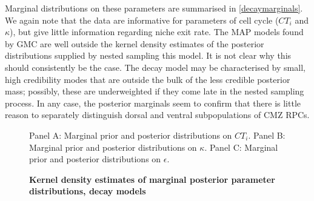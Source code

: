 \documentclass{ut-thesis}
\begin{document}
\begin{NoHyper}
Marginal distributions on these parameters are summarised in \autoref{decaymarginals}. We again note that the data are informative for parameters of cell cycle ($CT_{i}$ and $\kappa$), but give little information regarding niche exit rate. The MAP models found by GMC are well outside the kernel density estimates of the posterior distributions supplied by nested sampling this model. It is not clear why this should consistently be the case. The decay model may be characterised by small, high credibility modes that are outside the bulk of the less credible posterior mass; possibly, these are underweighted if they come late in the nested sampling process. In any case, the posterior marginals seem to confirm that there is little reason to separately distinguish dorsal and ventral subpopulations of CMZ RPCs.

\begin{figure}[!h]
    \caption{{\bf Kernel density estimates of marginal posterior parameter distributions, decay models}}
    \label{decaymarginals}

    Panel A: Marginal prior and posterior distributions on $CT_{i}$.
    Panel B: Marginal prior and posterior distributions on $\kappa$.
    Panel C: Marginal prior and posterior distributions on $\epsilon$.


\end{figure}
\end{NoHyper}
\end{document}
